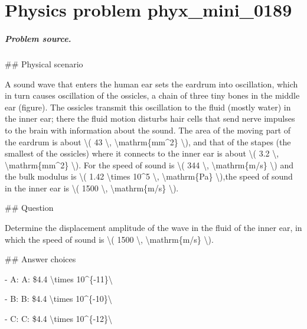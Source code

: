 
\chapter{Physics problem phyx\_mini\_0189}
\label{ch:PhyXMiniProblems_problem_phyx_mini_0189}

\paragraph{Problem source.}
\#\# Physical scenario

A sound wave that enters the human ear sets the eardrum into oscillation, which in turn causes oscillation of the ossicles, a chain of three tiny bones in the middle ear (figure). The ossicles transmit this oscillation to the fluid (mostly water) in the inner ear; there the fluid motion disturbs hair cells that send nerve impulses to the brain with information about the sound. The area of the moving part of the eardrum is about \textbackslash{}( 43 \textbackslash{}, \textbackslash{}mathrm\{mm\textasciicircum{}2\} \textbackslash{}), and that of the stapes (the smallest of the ossicles) where it connects to the inner ear is about \textbackslash{}( 3.2 \textbackslash{}, \textbackslash{}mathrm\{mm\textasciicircum{}2\} \textbackslash{}). For the speed of sound is \textbackslash{}( 344 \textbackslash{}, \textbackslash{}mathrm\{m/s\} \textbackslash{}) and the bulk modulus is \textbackslash{}( 1.42 \textbackslash{}times 10\textasciicircum{}5 \textbackslash{}, \textbackslash{}mathrm\{Pa\} \textbackslash{}),the speed of sound in the inner ear is \textbackslash{}( 1500 \textbackslash{}, \textbackslash{}mathrm\{m/s\} \textbackslash{}).

\#\# Question

Determine the displacement amplitude of the wave in the fluid of the inner ear, in which the speed of sound is \textbackslash{}( 1500 \textbackslash{}, \textbackslash{}mathrm\{m/s\} \textbackslash{}).

\#\# Answer choices

- A: A: \$4.4 \textbackslash{}times 10\textasciicircum{}\{-11\}\textbackslash{}

- B: B: \$4.4 \textbackslash{}times 10\textasciicircum{}\{-10\}\textbackslash{}

- C: C: \$4.4 \textbackslash{}times 10\textasciicircum{}\{-12\}\textbackslash{}

